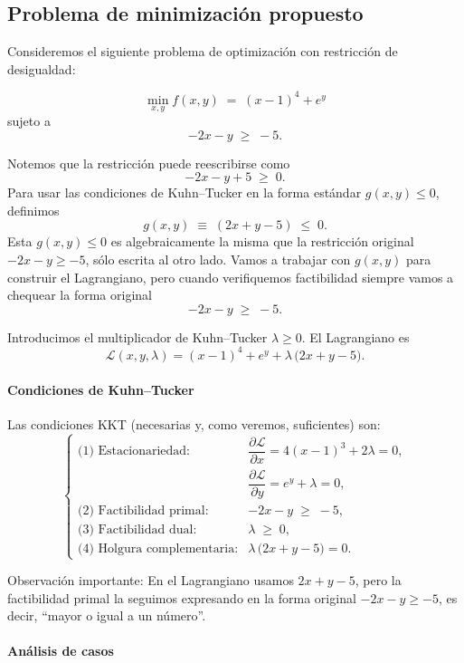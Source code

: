 \documentclass{article}
\begin{document}
\subsection*{Problema de minimización propuesto}

Consideremos el siguiente problema de optimización con restricción de desigualdad:

\[
\min_{x,y} f(x,y) \;=\; (x-1)^4 + e^{y}
\]
sujeto a
\[
-2x - y \;\ge\; -5.
\]

Notemos que la restricción puede reescribirse como
\[
-2x - y + 5 \;\ge\; 0.
\]
Para usar las condiciones de Kuhn--Tucker en la forma estándar \(g(x,y)\le 0\), definimos
\[
g(x,y) \;\equiv\; (2x + y - 5) \;\le\; 0.
\]
Esta $g(x,y)\le0$ es algebraicamente la misma que la restricción original \(-2x-y\ge -5\), sólo escrita al otro lado. Vamos a trabajar con \(g(x,y)\) para construir el Lagrangiano, pero cuando verifiquemos factibilidad siempre vamos a chequear la forma original
\[
-2x - y \;\ge\; -5.
\]

Introducimos el multiplicador de Kuhn--Tucker \(\lambda \ge 0\).  
El Lagrangiano es
\[
\mathcal{L}(x,y,\lambda)
= (x-1)^4 + e^{y}
+ \lambda\,\bigl(2x + y - 5\bigr).
\]

\paragraph{Condiciones de Kuhn--Tucker}

Las condiciones KKT (necesarias y, como veremos, suficientes) son:
\[
\begin{cases}
\text{(1) Estacionariedad:} &
\dfrac{\partial \mathcal{L}}{\partial x}
=4(x-1)^3 + 2\lambda
=0,
\\[8pt]
&
\dfrac{\partial \mathcal{L}}{\partial y}
=e^{y} + \lambda
=0,
\\[10pt]
\text{(2) Factibilidad primal:} &
-2x - y \;\ge\; -5,
\\[6pt]
\text{(3) Factibilidad dual:} &
\lambda \;\ge\; 0,
\\[6pt]
\text{(4) Holgura complementaria:} &
\lambda\,\bigl(2x + y - 5\bigr)=0.
\end{cases}
\]

Observación importante:  
En el Lagrangiano usamos \(2x+y-5\), pero la factibilidad primal la seguimos expresando en la forma original \(-2x-y\ge -5\), es decir, ``mayor o igual a un número''.

\paragraph{Análisis de casos}
\end{document}
